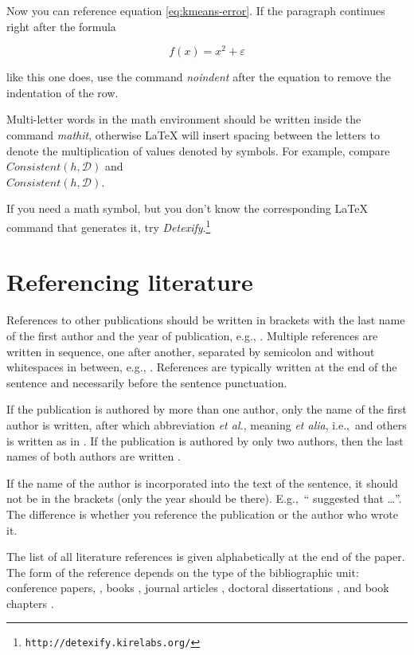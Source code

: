 \documentclass[10pt, a4paper]{article}
\begin{document}
Now you can reference equation \eqref{eq:kmeans-error}. If the paragraph continues right after the formula

\begin{equation}
f(x) = x^2 + \varepsilon
\end{equation}

\noindent like this one does, use the command \emph{noindent} after the equation to remove the indentation of the row. 

Multi-letter words in the math environment should be written inside the command \emph{mathit}, otherwise \LaTeX{} will insert spacing between the letters to denote the multiplication of values denoted by symbols. For example, compare
$\mathit{Consistent}(h,\mathcal{D})$ and\\
$Consistent(h,\mathcal{D})$.

If you need a math symbol, but you don't know the corresponding \LaTeX{} command that generates it, try
\emph{Detexify}.\footnote{\texttt{http://detexify.kirelabs.org/}}

\section{Referencing literature}

References to other publications should be written in brackets with the last name of the first author and the year of publication, e.g., \citep{chomsky-73}.  Multiple references are written in sequence, one after another, separated by semicolon and without whitespaces in between, e.g., \citep{chomsky-73,chave-64,feigl-58}. References are typically written at the end of the sentence and necessarily before the sentence punctuation.

If the publication is authored by more than one author, only the name of the first author is written, after which abbreviation \emph{et al.}, meaning \emph{et alia}, i.e.,~and others is written as in \citep{johnson-etc}. If the publication is authored by only two authors, then the last names of both authors are written \citep{johnson-howells}.

If the name of the author is incorporated into the text of the sentence, it should not be in the brackets (only the year should be there). E.g.,~``\citet{chomsky-73}
suggested that \dots''. The difference is whether you reference the publication or the author who wrote it. 

The list of all literature references is given alphabetically at the end of the paper. The form of the reference depends on the type of the bibliographic unit: conference papers,
\citep{chave-64}, books \citep{butcher-81}, journal articles
\citep{howells-51}, doctoral dissertations \citep{croft-78}, and book chapters \citep{feigl-58}. 
\end{document}
